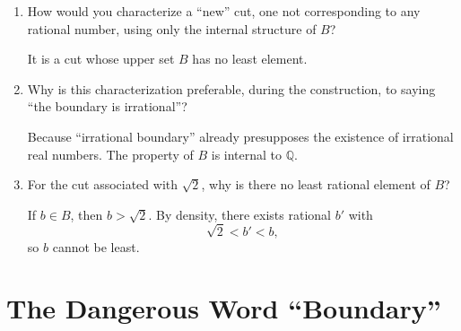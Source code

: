 \documentclass{essay}
\begin{document}
\begin{enumerate}[label=\arabic*., itemsep=10pt]
\item How would you characterize a ``new'' cut, one not corresponding to any rational number, using only the internal structure of $B$?

\begin{answer}
It is a cut whose upper set $B$ has no least element.
\end{answer}

\item Why is this characterization preferable, during the construction, to saying
``the boundary is irrational''?

\begin{answer}
Because ``irrational boundary'' already presupposes the existence of irrational real numbers. The property of $B$ is internal to $\mathbb{Q}$.
\end{answer}

\item For the cut associated with $\sqrt{2}$, why is there no least rational element of $B$?

\begin{answer}
If $b\in B$, then $b>\sqrt2$. By density, there exists rational $b'$ with
\[
\sqrt2<b'<b,
\]
so $b$ cannot be least.
\end{answer}

\end{enumerate}

\section{The Dangerous Word ``Boundary''}
\end{document}
